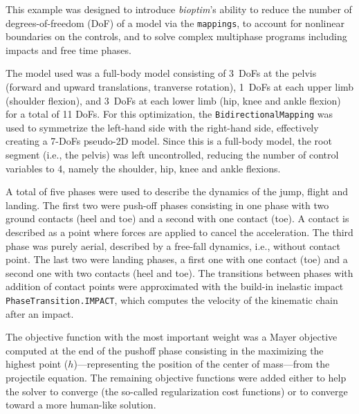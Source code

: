 This example was designed to introduce \emph{bioptim}'s ability to reduce the number of degrees-of-freedom (DoF) of a model via the \texttt{mappings}, to account for nonlinear boundaries on the controls, and to solve complex multiphase programs including impacts and free time phases.

The model used was a full-body model consisting of 3~DoFs at the pelvis (forward and upward translations, tranverse rotation), 1~DoFs at each upper limb (shoulder flexion), and 3~DoFs at each lower limb (hip, knee and ankle flexion) for a total of 11 DoFs.
For this optimization, the \texttt{BidirectionalMapping} was used to symmetrize the left-hand side with the right-hand side, effectively creating a 7-DoFs pseudo-2D model. 
Since this is a full-body model, the root segment (i.e., the pelvis) was left uncontrolled, reducing the number of control variables to 4, namely the shoulder, hip, knee and ankle flexions. 

A total of five phases were used to describe the dynamics of the jump, flight and landing. 
The first two were push-off phases consisting in one phase with two ground contacts (heel and toe) and a second with one contact (toe). 
A contact is described as a point where forces are applied to cancel the acceleration. 
The third phase was purely aerial, described by a free-fall dynamics, i.e., without contact point.
The last two were landing phases, a first one with one contact (toe) and a second one with two contacts (heel and toe).
The transitions between phases with addition of contact points were approximated with the build-in inelastic impact \texttt{PhaseTransition.IMPACT}, which computes the velocity of the kinematic chain after an impact.

The objective function with the most important weight was a Mayer objective computed at the end of the pushoff phase consisting in the maximizing the highest point ($h$)---representing the position of the center of mass---from the projectile equation.
The remaining objective functions were added either to help the solver to converge (the so-called regularization cost functions) or to converge toward a more human-like solution. 

